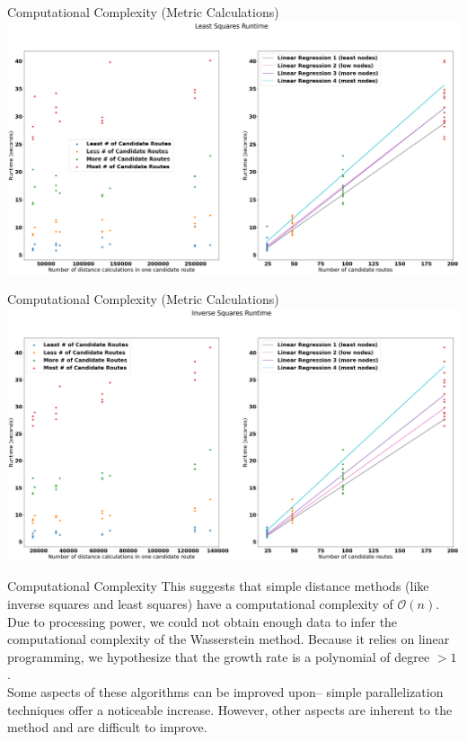 \documentclass[aspectratio=169, bigfiles]{beamer}
\begin{document}
\begin{frame}{Computational Complexity (Metric Calculations)}
    \centering
    \includegraphics[scale=0.18]{Jupyter Notebook LaTeX/complexity1.png}
\end{frame}

\begin{frame}{Computational Complexity (Metric Calculations)}
    \centering
    \includegraphics[scale=0.18]{Jupyter Notebook LaTeX/complexity2.png}

\end{frame}

\begin{frame}{Computational Complexity}
    This suggests that simple distance methods (like inverse squares and least squares) have a computational complexity of $\mathcal{O}(n)$. Due to processing power, we could not obtain enough data to infer the computational complexity of the Wasserstein method. Because it relies on linear programming, we hypothesize that the growth rate is a polynomial of degree $>1$.\\
\vspace{5mm}
    Some aspects of these algorithms can be improved upon-- simple parallelization techniques offer a noticeable increase. However, other aspects are inherent to the method and are difficult to improve.
\end{frame}
\end{document}

